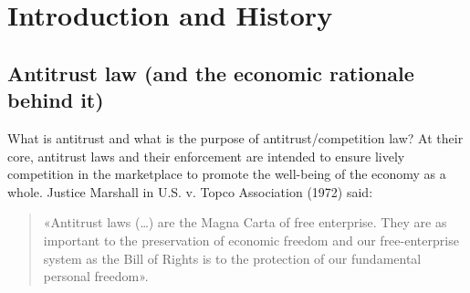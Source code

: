 \chapter{Introduction and History}
\vspace{-1.5cm}

{\chaptoc\noindent\begin{minipage}[inner sep=0,outer sep=0]{0.9\linewidth}\section{Antitrust law (and the economic rationale behind it)}\end{minipage}}

    What is antitrust and what is the purpose of antitrust/competition law? 
    At their core, antitrust laws and their enforcement are intended to ensure lively competition in the marketplace to promote the well-being of the economy as a whole.
    Justice Marshall in U.S. v. Topco Association (1972) said:
    \begin{quote}
        «Antitrust laws (…) are the Magna Carta of free enterprise. They are as important to the preservation of economic freedom and our free-enterprise system as the Bill of Rights is to the protection of our fundamental personal freedom». 
    \end{quote}

    

